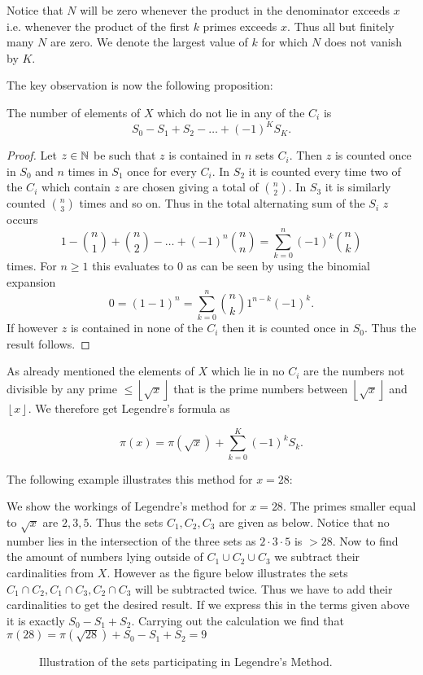 Notice that $N$ will be zero whenever the product in the denominator exceeds $x$ i.e.
whenever the product of the first $k$ primes exceeds $x$.
Thus all but finitely many $N$ are zero. We denote the largest value of $k$ for which $N$ does not vanish by $K$.

The key observation is now the following proposition:
\begin{proposition}
	The number of elements of $X$ which do not lie in any of the $C_{i}$ is
	\[
		S_0 - S_1 + S_2 - \ldots + (-1)^{K} S_{K}
	.\] 
\end{proposition}

\begin{proof}
	Let $z \in \mathbb{N}$ be such that $z$ is contained in $n$ sets $C_{i}$.
	Then $z$ is counted once in $S_0$ and $n$ times in $S_1$ once for every $C_{i}$.
	In $S_2$ it is counted every time two of the $C_{i}$ which contain $z$ are chosen giving a total of $\binom{n}{2}$.
	In  $S_3$ it is similarly counted $\binom{n}{3}$ times and so on. Thus in the total alternating sum of the $S_{i}$ 
	$z$ occurs
	 \[
		 1 - \binom{n}{1} + \binom{n}{2} - \ldots + (-1)^{n} \binom{n}{n} = \sum_{k=0}^{n} (-1)^{k} \binom{n}{k}
	\] 
	times. For $n \geq 1$ this evaluates to $0$ as can be seen by using the binomial expansion
	\[
		0 = (1 -1)^{n} = \sum_{k=0}^{n} \binom{n}{k} 1^{n-k} (-1)^{k}
	.\] 
	If however $z$ is contained in none of the $C_{i}$ then it is counted once in $S_{0}$. Thus the result follows.
\end{proof}

As already mentioned the elements of $X$ which lie in no $C_{i}$ are the numbers not divisible by any prime $\leq \left\lfloor \sqrt{x}  \right\rfloor$
that is the prime numbers between $\left\lfloor \sqrt{x}  \right\rfloor$ and $\left\lfloor x \right\rfloor$.
We therefore get Legendre's formula as
\begin{theorem}
	 \[
		 \pi(x) = \pi(\sqrt{x} ) + \sum_{k=0}^{K} (-1)^{k} S_{k}
	.\] 
\end{theorem}

The following example illustrates this method for $x = 28$:
\begin{eg}
	We show the workings of Legendre's method for $x = 28$. The primes smaller equal to $\sqrt{x}$ 
	are $2,3,5$. Thus the sets  $C_1,C_2,C_3$ are given as below.
	Notice that no number lies in the intersection of the three sets as $2\cdot 3\cdot 5$ is $> 28$.
	Now to find the amount of numbers lying outside of $C_1 \cup C_2 \cup C_3$ we subtract
	their cardinalities from $X$. However as the figure below illustrates the sets
	$C_1 \cap C_2, C_1 \cap C_3, C_2 \cap C_3$ will be subtracted twice.
	Thus we have to add their cardinalities to get the desired result. If we express this in the terms given above it is exactly
	$S_0 - S_1 + S_2$.
	Carrying out the calculation we find that $\pi(28) = \pi(\sqrt{28}) + S_0 - S_1 + S_2 = 9$
	\begin{figure}[htpb]
		\centering
		\def\svgwidth{0.7\textwidth}
		
		\caption{Illustration of the sets participating in Legendre's Method.}
		\label{fig:legendre}
	\end{figure}

\end{eg}

